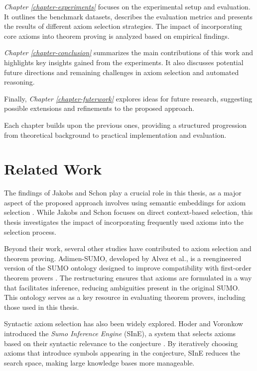 \documentclass[english,version-2020-11]{uzl-thesis}
\begin{document}
\textit{Chapter \ref{chapter-experiments}} focuses on the experimental setup and evaluation. It outlines the benchmark datasets, describes the evaluation metrics and presents the results of different axiom selection strategies. The impact of incorporating core axioms into theorem proving is analyzed based on empirical findings.

\textit{Chapter \ref{chapter-conclusion}} summarizes the main contributions of this work and highlights key insights gained from the experiments. It also discusses potential future directions and remaining challenges in axiom selection and automated reasoning.

Finally, \textit{Chapter \ref{chapter-futerwork}} explores ideas for future research, suggesting possible extensions and refinements to the proposed approach.

Each chapter builds upon the previous ones, providing a structured progression from theoretical background to practical implementation and evaluation.


\chapter{Related Work}
\label{chapter-relatedwork}
The findings of Jakobs and Schon play a crucial role in this thesis, as a major aspect of the proposed approach involves using semantic embeddings for axiom selection \cite{Schon2024}.
While Jakobs and Schon focuses on direct context-based selection, this thesis investigates the impact of incorporating frequently used axioms into the selection process.

Beyond their work, several other studies have contributed to axiom selection and theorem proving. Adimen-SUMO, developed by Alvez et al., is a reengineered version of the SUMO ontology designed to improve compatibility with first-order theorem provers \cite{Alvez2014}. The restructuring ensures that axioms are formulated in a way that facilitates inference, reducing ambiguities present in the original SUMO. This ontology serves as a key resource in evaluating theorem provers, including those used in this thesis.

Syntactic axiom selection has also been widely explored. Hoder and Voronkow introduced the \textit{Sumo Inference Engine} (SInE), a system that selects axioms based on their syntactic relevance to the conjecture \cite{Hoder2011}. By iteratively choosing axioms that introduce symbols appearing in the conjecture, SInE reduces the search space, making large knowledge bases more manageable.
\end{document}
